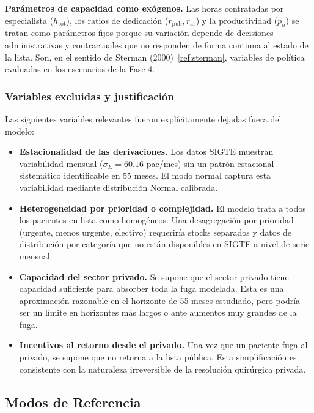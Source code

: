 \documentclass[12pt,a4paper]{article}
\begin{document}
\textbf{Parámetros de capacidad como exógenos.} Las horas contratadas por especialista ($h_{\text{tot}}$), los ratios de dedicación ($r_{\text{pub}}, r_{\text{at}}$) y la productividad ($p_h$) se tratan como parámetros fijos porque su variación depende de decisiones administrativas y contractuales que no responden de forma continua al estado de la lista. Son, en el sentido de Sterman (2000)~\ref{ref:sterman}, variables de política evaluadas en los escenarios de la Fase 4.

\subsubsection*{Variables excluidas y justificación}

Las siguientes variables relevantes fueron explícitamente dejadas fuera del modelo:

\begin{itemize}[leftmargin=1.5cm]
  \item \textbf{Estacionalidad de las derivaciones.} Los datos SIGTE muestran variabilidad mensual ($\sigma_E = 60.16$ pac/mes) sin un patrón estacional sistemático identificable en 55 meses. El modo normal captura esta variabilidad mediante distribución Normal calibrada.
  \item \textbf{Heterogeneidad por prioridad o complejidad.} El modelo trata a todos los pacientes en lista como homogéneos. Una desagregación por prioridad (urgente, menos urgente, electivo) requeriría stocks separados y datos de distribución por categoría que no están disponibles en SIGTE a nivel de serie mensual.
  \item \textbf{Capacidad del sector privado.} Se supone que el sector privado tiene capacidad suficiente para absorber toda la fuga modelada. Esta es una aproximación razonable en el horizonte de 55 meses estudiado, pero podría ser un límite en horizontes más largos o ante aumentos muy grandes de la fuga.
  \item \textbf{Incentivos al retorno desde el privado.} Una vez que un paciente fuga al privado, se supone que no retorna a la lista pública. Esta simplificación es consistente con la naturaleza irreversible de la resolución quirúrgica privada.
\end{itemize}

\subsection{Modos de Referencia}
\end{document}
